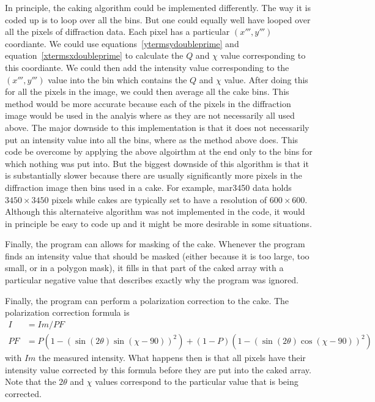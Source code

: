 In principle, the caking algorithm could be implemented
differently. The way it is coded up is to loop over
all the bins. But one could equally well have looped over
all the pixels of diffraction data. Each pixel has a
particular $(x''',y''')$ coordiante. We could use
equations~\ref{ytermsydoubleprime} and
equation~\ref{xtermsxdoubleprime} to calculate the $Q$
and $\chi$ value corresponding to this coordiante. We
could then add the intensity value corresponding to the
$(x''',y''')$ value into the bin which contains the
$Q$ and $\chi$ value. After doing this for all the pixels
in the image, we could then average all the cake bins.
This method would be more accurate because each of the 
pixels in the diffraction image would be used in the analyis
where as they are not necessarily all used above. The major
downside to this implementation is that it does not 
necessarily put an intensity value into all the bins, where 
as the method above does. This code be overcome by applying
the above algoirthm at the end only to the bins for which
nothing was put into. But the biggest downside of this 
algorithm is that it is substantially slower because there
are usually significantly more pixels in the diffraction
image then bins used in a cake. For example, mar3450 data
holds $3450\times 3450$ pixels while cakes are typically set
to have a resolution of $600\times 600$. Although
this alternateive algorithm was not implemented in the code,
it would in principle be easy to code up and it might
be more desirable in some situations.


Finally, the program can allows for masking of the cake.
Whenever the program finds an intensity value
that should be masked (either because it is too 
large, too small, or in a polygon mask), it fills
in that part of the caked array with a particular 
negative value that describes exactly why the
program was ignored.

Finally, the program can perform a polarization 
correction to the cake. The polarization 
correction formula is
\begin{align}
    I&=Im/PF \\ 
    PF&=P(1 - (\sin(2\theta)\sin(\chi-90))^2) + 
    (1 - P)(1 - (\sin(2\theta)\cos(\chi-90))^2)
\end{align}
with $Im$ the measured intensity. What happens
then is that all pixels have their intensity
value corrected by this formula before they
are put into the caked array. Note that the 
$2\theta$ and $\chi$
values correspond to the particular value
that is being corrected.

